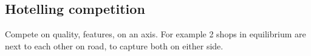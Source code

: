 
\subsection{Hotelling competition}

Compete on quality, features, on an axis. For example 2 shops in equilibrium are next to each other on road, to capture both on either side.

